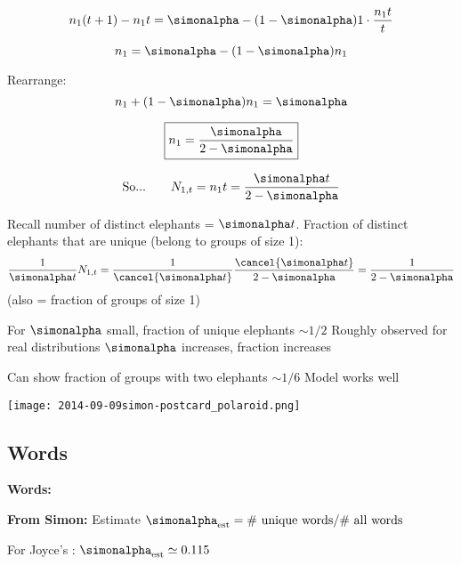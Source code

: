     $$
    n_1(t+1) - n_1 t 
    =
    \simonalpha
    -(1-\simonalpha)
    1\cdot\frac{n_{1}t}{t}
    $$
   
    $$
    n_1
    =
    \simonalpha
    -(1-\simonalpha) n_1
    $$
   
    Rearrange:
    $$
    n_1 + ( 1-\simonalpha) n_1 
    = \simonalpha
    $$
   
    $$
    \boxed{
      n_1 
      = \frac{\simonalpha}{2-\simonalpha}
    }
    $$
  
  





  
    $$
    \mbox{So...} \qquad
    N_{1,t} = n_1 t
    = \frac{\simonalpha t}{2-\simonalpha}
    $$
    
     Recall number of distinct elephants = $\simonalpha t$.
     Fraction of distinct elephants that are unique
      (belong to groups of size 1):
      $$
      \frac{1}
      {\simonalpha t}
      N_{1,t}
      =
      \frac{1}
      {\cancel{\simonalpha t}}
      \frac{\cancel{\simonalpha t}}{2-\simonalpha}
      = \frac{1}{2-\simonalpha}
      $$
      (also = fraction of groups of size 1)
     
      For $\simonalpha$ small, fraction of unique elephants $\sim 1/2$
     Roughly observed for real distributions
     $\simonalpha$ increases, fraction increases
     
      Can show fraction of groups with two elephants $\sim 1/6$
     Model works well 
    
  


  \texttt{[image: 2014-09-09simon-postcard\_polaroid.png]}


\subsection{Words}

  \textbf{Words:}

  \textbf{From Simon\cite{simon1955a}:}
    Estimate $\simonalpha_{\textrm{est}} = \mbox{\# unique words}/\mbox{\# all words}$

    \medskip

    {
      For Joyce's : $\simonalpha_{\textrm{est}} \simeq 0.115 $
    }

